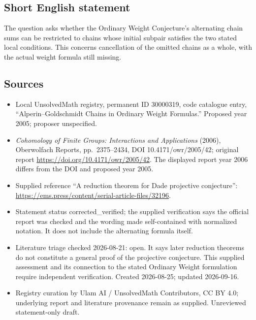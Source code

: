 \documentclass[11pt]{article}
\begin{document}
\subsection{Short English statement}
The question asks whether the Ordinary Weight Conjecture's alternating chain sums can be restricted to chains whose initial subpair satisfies the two stated local conditions. This concerns cancellation of the omitted chains as a whole, with the actual weight formula still missing.
\subsection{Sources}
\begin{itemize}
\item Local UnsolvedMath registry, permanent ID 30000319, code catalogue entry, ``Alperin--Goldschmidt Chains in Ordinary Weight Formulas.'' Proposed year 2005; proposer unspecified.
\item \emph{Cohomology of Finite Groups: Interactions and Applications} (2006), Oberwolfach Reports, pp.\ 2375--2434, DOI 10.4171/owr/2005/42; original report \url{https://doi.org/10.4171/owr/2005/42}. The displayed report year 2006 differs from the DOI and proposed year 2005.
\item Supplied reference ``A reduction theorem for Dade projective conjecture'': \url{https://ems.press/content/serial-article-files/32196}.
\item Statement status corrected\_verified; the supplied verification says the official report was checked and the wording made self-contained with normalized notation. It does not include the alternating formula itself.
\item Literature triage checked 2026-08-21: open. It says later reduction theorems do not constitute a general proof of the projective conjecture. This supplied assessment and its connection to the stated Ordinary Weight formulation require independent verification. Created 2026-08-25; updated 2026-09-16.
\item Registry curation by Ulam AI / UnsolvedMath Contributors, CC BY 4.0; underlying report and literature provenance remain as supplied. Unreviewed statement-only draft.
\end{itemize}
\end{document}
